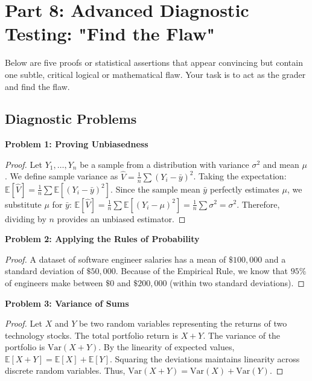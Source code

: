 \documentclass[11pt]{article}
\theoremstyle{definition}
\theoremstyle{remark}
\newcommand{\E}{\mathbb{E}}
\newcommand{\Var}{\text{Var}}
\newcommand{\samplemean}{\bar{y}}
\begin{document}
\section{Part 8: Advanced Diagnostic Testing: "Find the Flaw"}

Below are five proofs or statistical assertions that appear convincing but contain one subtle, critical logical or mathematical flaw. Your task is to act as the grader and find the flaw.

\subsection{Diagnostic Problems}

\textbf{Problem 1: Proving Unbiasedness}
\begin{proof}
Let $Y_1, \dots, Y_n$ be a sample from a distribution with variance $\sigma^2$ and mean $\mu$. 
We define sample variance as $\hat{V} = \frac{1}{n} \sum (Y_i - \samplemean)^2$.
Taking the expectation: 
$\E[\hat{V}] = \frac{1}{n} \sum \E[(Y_i - \samplemean)^2]$. 
Since the sample mean $\samplemean$ perfectly estimates $\mu$, we substitute $\mu$ for $\samplemean$:
$\E[\hat{V}] = \frac{1}{n} \sum \E[(Y_i - \mu)^2] = \frac{1}{n} \sum \sigma^2 = \sigma^2$. 
Therefore, dividing by $n$ provides an unbiased estimator.
\end{proof}

\textbf{Problem 2: Applying the Rules of Probability}
\begin{proof}
A dataset of software engineer salaries has a mean of $\$100,000$ and a standard deviation of $\$50,000$. Because of the Empirical Rule, we know that $95\%$ of engineers make between $\$0$ and $\$200,000$ (within two standard deviations). 
\end{proof}

\textbf{Problem 3: Variance of Sums}
\begin{proof}
Let $X$ and $Y$ be two random variables representing the returns of two technology stocks. The total portfolio return is $X+Y$. The variance of the portfolio is $\Var(X+Y)$. By the linearity of expected values, $\E[X+Y] = \E[X] + \E[Y]$. Squaring the deviations maintains linearity across discrete random variables. Thus, $\Var(X+Y) = \Var(X) + \Var(Y)$.
\end{proof}
\end{document}
